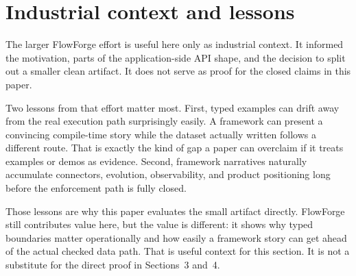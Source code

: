 \section{Industrial context and lessons}

The larger FlowForge effort is useful here only as industrial context. It informed the motivation, parts of the application-side API shape, and the decision to split out a smaller clean artifact. It does not serve as proof for the closed claims in this paper.

Two lessons from that effort matter most. First, typed examples can drift away from the real execution path surprisingly easily. A framework can present a convincing compile-time story while the dataset actually written follows a different route. That is exactly the kind of gap a paper can overclaim if it treats examples or demos as evidence. Second, framework narratives naturally accumulate connectors, evolution, observability, and product positioning long before the enforcement path is fully closed.

Those lessons are why this paper evaluates the small artifact directly. FlowForge still contributes value here, but the value is different: it shows why typed boundaries matter operationally and how easily a framework story can get ahead of the actual checked data path. That is useful context for this section. It is not a substitute for the direct proof in Sections~3 and~4.
